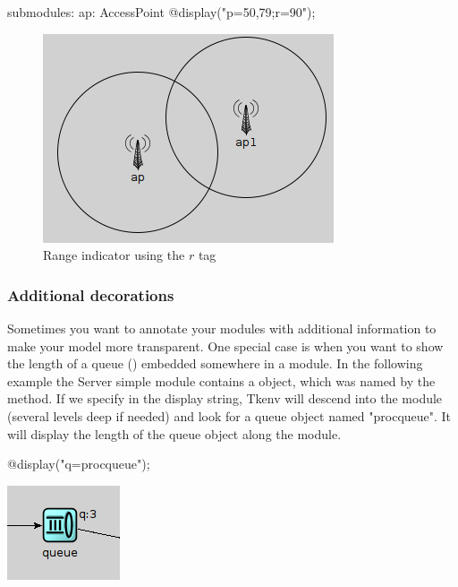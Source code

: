 \begin{ned}
submodules:
    ap: AccessPoint {
        @display("p=50,79;r=90");
    }
\end{ned}

\begin{figure}[htbp]
  \begin{center}
    \includegraphics{figures/graphics-rtag}
    \caption{Range indicator using the $r$ tag}
    \label{fig:graphics-rtag}
  \end{center}
\end{figure}

\subsubsection{Additional decorations}
Sometimes you want to annotate your modules with additional information
to make your model more transparent. One special case is when you want to
show the length of a queue () embedded somewhere in a module.
In the following example the Server simple module contains a  object,
which was named by the  method.
If we specify  in the display string, Tkenv will descend into
the module (several levels deep if needed) and look for a queue object
named "procqueue". It will display the length of the queue object along the module.

\begin{ned}
@display("q=procqueue");
\end{ned}

\begin{center}
\includegraphics{figures/graphics-qtag}
\end{center}

